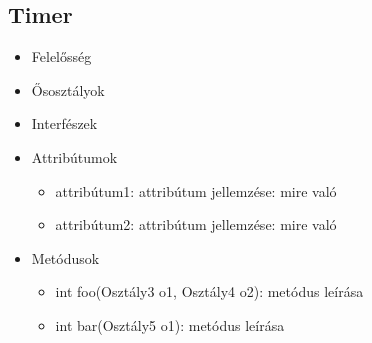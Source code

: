 \subsection{Timer}
\begin{itemize}
\item Felelősség\\
\item Ősosztályok\\
\item Interfészek\\
\item Attribútumok\\
	\begin{itemize}
		\item attribútum1: attribútum jellemzése: mire való
		\item attribútum2: attribútum jellemzése: mire való
	\end{itemize}
\item Metódusok\\
	\begin{itemize}
		\item int foo(Osztály3 o1, Osztály4 o2): metódus leírása
		\item int bar(Osztály5 o1): metódus leírása
	\end{itemize}
\end{itemize}

